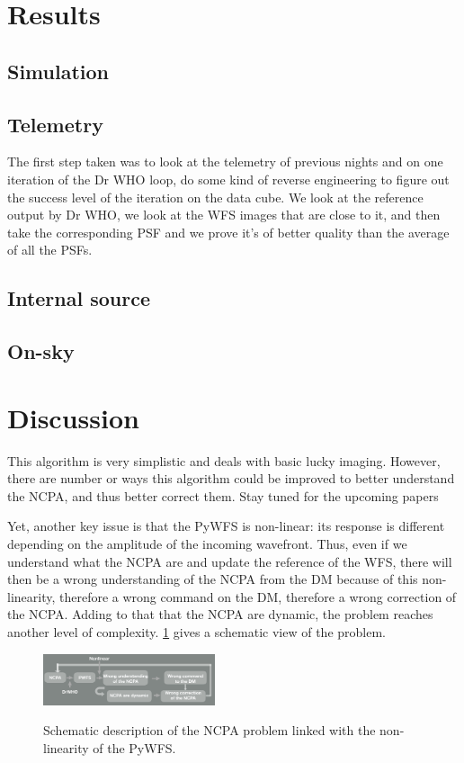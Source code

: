 \documentclass[twocolumn]{aastex62}
\begin{document}
\section{Results}

\subsection{Simulation}
\subsection{Telemetry}
The first step taken was to look at the telemetry of previous nights and on one iteration of the Dr WHO loop, do some kind of reverse engineering to figure out the success level of the iteration on the data cube. We look at the reference output by Dr WHO, we look at the WFS images that are close to it, and then take the corresponding PSF and we prove it's of better quality than the average of all the PSFs. 


\subsection{Internal source}
\subsection{On-sky}


\section{Discussion}
This algorithm is very simplistic and deals with basic lucky imaging. However, there are number or ways this algorithm could be improved to better understand the NCPA, and thus better correct them. Stay tuned for the upcoming papers 

Yet, another key issue is that the PyWFS is non-linear: its response is different depending on the amplitude of the incoming wavefront. Thus, even if we understand what the NCPA are and update the reference of the WFS, there will then be a wrong understanding of the NCPA from the DM because of this non-linearity, therefore a wrong command on the DM, therefore a wrong correction of the NCPA. Adding to that that the NCPA are dynamic, the problem reaches another level of complexity. \ref{fig:pyr_ncpa_pb} gives a schematic view of the problem. 

\begin{figure}[h!]
  \centering
    \includegraphics[width=0.45\textwidth]{fig/pyr_ncpa_pb.png}\
      \caption{Schematic description of the NCPA problem linked with the non-linearity of the PyWFS.}
    \label{fig:pyr_ncpa_pb}
\end{figure}
\end{document}
